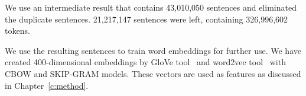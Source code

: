 We use an intermediate result that contains 43,010,050 sentences and eliminated
the duplicate sentences. 21,217,147 sentences were left, containing
326,996,602 tokens.

We use the resulting sentences to train word embeddings for further use.
We have created 400-dimensional embeddings by GloVe tool~\citep{pennington2014glove}
and word2vec tool~\citep{mikolov2013efficient,mikolov2013distributed} with CBOW and
SKIP-GRAM models. These vectors are used as features as discussed in Chapter~\ref{c:method}.
